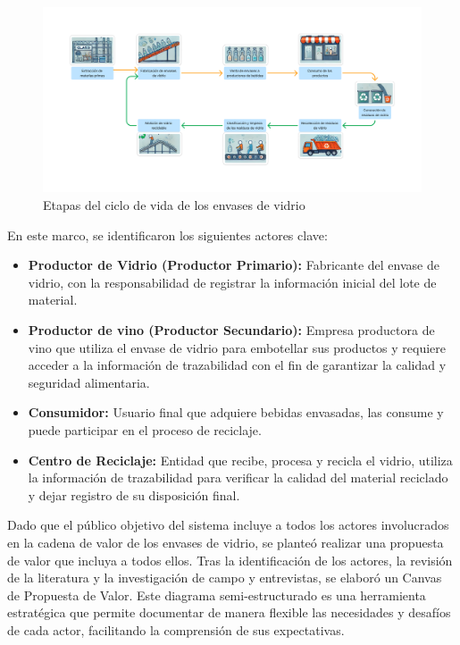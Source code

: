 \begin{figure}[!htpb]
    \centering
    \includegraphics[width=\linewidth]{Figures/glass-lifecycle.png}
    \caption{Etapas del ciclo de vida de los envases de vidrio}
    \label{fig:glass-lifecycle-modelling}
\end{figure}

En este marco, se identificaron los siguientes actores clave:

\begin{itemize}
    \item \textbf{Productor de Vidrio (Productor Primario):} Fabricante del envase de vidrio, con la responsabilidad de registrar la información inicial del lote de material.
    \item \textbf{Productor de vino (Productor Secundario):} Empresa productora de vino que utiliza el envase de vidrio para embotellar sus productos y requiere acceder a la información de trazabilidad con el fin de garantizar la calidad y seguridad alimentaria.
    \item \textbf{Consumidor:} Usuario final que adquiere bebidas envasadas, las consume y puede participar en el proceso de reciclaje.
    \item \textbf{Centro de Reciclaje:} Entidad que recibe, procesa y recicla el vidrio, utiliza la información de trazabilidad para verificar la calidad del material reciclado y dejar registro de su disposición final.
\end{itemize}

Dado que el público objetivo del sistema incluye a todos los actores involucrados en la cadena de valor de los envases de vidrio, se planteó realizar una propuesta de valor que incluya a todos ellos. Tras la identificación de los actores, la revisión de la literatura y la investigación de campo y entrevistas, se elaboró un Canvas de Propuesta de Valor. Este diagrama semi-estructurado es una herramienta estratégica que permite documentar de manera flexible las necesidades y desafíos de cada actor, facilitando la comprensión de sus expectativas.

